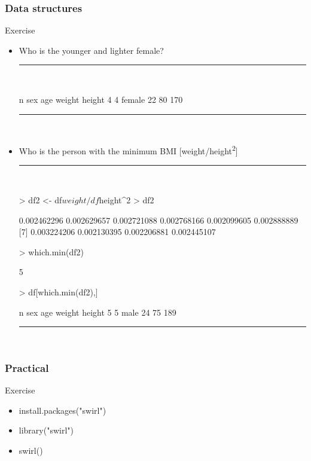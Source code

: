 \documentclass{beamer}
\begin{document}
\begin{frame}[fragile]
	\frametitle{Data structures}
	\centering \LARGE Exercise
	\begin{itemize}
		\small
		\item Who is the younger and lighter female?
\pause
\rule{\textwidth}{0.4pt}\\
\tiny
\setlength{\fancyvrbtopsep}{-1pt}
\setlength{\fancyvrbpartopsep}{-1pt}
\begin{Schunk}
\begin{Soutput}
  n    sex age weight height
4 4 female  22     80    170
\end{Soutput}
\end{Schunk}
\rule{\textwidth}{0.4pt}\\
\small
\pause
		\item Who is the person with the minimum BMI \tiny [weight/height\textsuperscript{2}]
\pause
\rule{\textwidth}{0.4pt}\\
\tiny
\setlength{\fancyvrbtopsep}{-1pt}
\setlength{\fancyvrbpartopsep}{-1pt}
\begin{Schunk}
\begin{Sinput}
> df2 <- df$weight / df$height^2
> df2
\end{Sinput}
\begin{Soutput}
 [1] 0.002462296 0.002629657 0.002721088 0.002768166 0.002099605 0.002888889
 [7] 0.003224206 0.002130395 0.002206881 0.002445107
\end{Soutput}
\begin{Sinput}
> which.min(df2)
\end{Sinput}
\begin{Soutput}
[1] 5
\end{Soutput}
\begin{Sinput}
> df[which.min(df2),]
\end{Sinput}
\begin{Soutput}
  n  sex age weight height
5 5 male  24     75    189
\end{Soutput}
\end{Schunk}
\rule{\textwidth}{0.4pt}\\
\small
	\end{itemize}
\end{frame}

\begin{frame}[fragile]
	\frametitle{Practical}
	\centering \LARGE Exercise
	\begin{itemize}
		\item install.packages("swirl")
		\item library("swirl")
		\item swirl()
	\end{itemize}
\end{frame}
\end{document}
